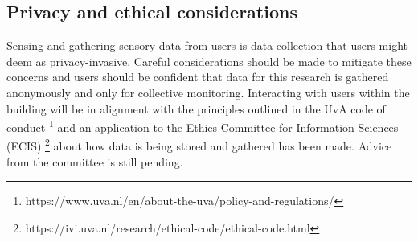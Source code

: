 \subsection{Privacy and ethical considerations}
Sensing and gathering sensory data from users is data collection that users might deem as privacy-invasive. Careful considerations should be made to mitigate these concerns and users should be confident that data for this research is gathered anonymously and only for collective monitoring. Interacting with users within the building will be in alignment with the principles outlined in the UvA code of conduct \footnote{https://www.uva.nl/en/about-the-uva/policy-and-regulations/} and an application to the Ethics Committee for Information Sciences (ECIS) \footnote{https://ivi.uva.nl/research/ethical-code/ethical-code.html} about how data is being stored and gathered has been made. Advice from the committee is still pending.